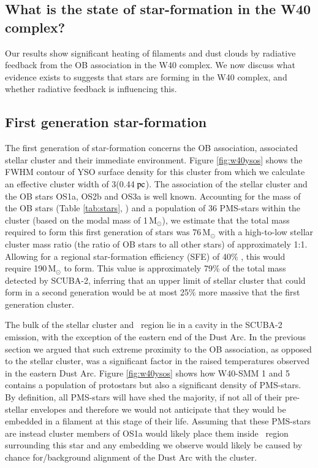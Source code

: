 \subsection{What is the state of star-formation in the W40 complex?}

Our results show significant heating of filaments and dust clouds by radiative feedback 
from the OB association in the W40 complex. We now discuss what evidence exists to 
suggests that stars are forming in the W40 complex, and whether radiative feedback is 
influencing this.

\subsection{First generation star-formation}

The first generation of star-formation concerns the OB association, associated stellar 
cluster and their immediate environment. Figure \ref{fig:w40ysos} shows the FWHM 
contour of YSO surface density for this cluster from which we calculate an effective 
cluster width of 3\arcmin (0.44$\hbox{ pc}$). The association of the stellar cluster 
and the OB stars OS1a, OS2b and OS3a is well known. Accounting for the mass of 
the OB stars (Table \ref{tab:stars}, \citeauthor{Shuping:2012ly}\citeyear{Shuping:2012ly}) 
and a population of 36 PMS-stars within the cluster (based on the modal mass of 
1\,M$_{\odot}$), we estimate that the total mass required to form this first generation 
of stars was 76\,M$_{\odot}$ with a high-to-low stellar cluster mass ratio (the ratio of 
OB stars to all other stars) of approximately 1:1. Allowing for a regional star-formation 
efficiency (SFE) of 40\% \citep{Konyves:2015uq}, this would require 190\,M$_{\odot}$ 
to form. This value is approximately 79\% of the total mass detected by SCUBA-2, 
inferring that an upper limit of stellar cluster that could form in a second generation 
would be at most 25\% more massive that the first generation cluster. 

The bulk of the stellar cluster and \HII\ region lie in a cavity in the SCUBA-2 emission, 
with the exception of the eastern end of the Dust Arc. In the previous section we argued 
that such extreme proximity to the OB association, as opposed to the stellar cluster, 
was a significant factor in the raised temperatures observed in the eastern Dust Arc. 
Figure \ref{fig:w40ysos} shows how W40-SMM 1 and 5 contains a population of 
protostars but also a significant density of PMS-stars. By definition, all PMS-stars will 
have shed the majority, if not all of their pre-stellar envelopes and therefore we would 
not anticipate that they would be embedded in a filament at this stage of their life. 
Assuming that these PMS-stars are instead cluster members of OS1a would likely 
place them inside \HII\ region surrounding this star and any embedding we observe 
would likely be caused by chance for/background alignment of the Dust Arc with the 
cluster.

